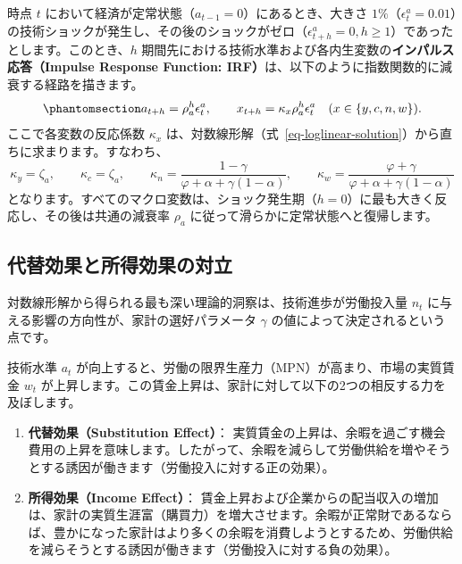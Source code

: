 \documentclass[
  japanese,
  lualatex,
  ja=standard,
  12pt,
  a4paper]{ltjsarticle}
\providecommand{\tightlist}{%
  \setlength{\itemsep}{0pt}\setlength{\parskip}{0pt}}
\begin{document}
時点 \(t\) において経済が定常状態（\(a_{t-1}=0\)）にあるとき、大きさ
\(1\%\)（\(\epsilon_t^a = 0.01\)）の技術ショックが発生し、その後のショックがゼロ（\(\epsilon_{t+h}^a = 0, h \geq 1\)）であったとします。このとき、\(h\)
期間先における技術水準および各内生変数の\textbf{インパルス応答（Impulse
Response Function:
IRF）}は、以下のように指数関数的に減衰する経路を描きます。
\begin{equation}\protect\phantomsection\label{eq-technology-irf}{
a_{t+h} = \rho_a^h \epsilon_t^a, \qquad x_{t+h} = \kappa_x \rho_a^h \epsilon_t^a \quad (x \in \{y, c, n, w\}).
}\end{equation} ここで各変数の反応係数 \(\kappa_x\)
は、対数線形解（式~\ref{eq-loglinear-solution}）から直ちに求まります。すなわち、
\[
\kappa_y = \zeta_a, \qquad \kappa_c = \zeta_a, \qquad \kappa_n = \frac{1-\gamma}{\varphi+\alpha+\gamma(1-\alpha)}, \qquad \kappa_w = \frac{\varphi+\gamma}{\varphi+\alpha+\gamma(1-\alpha)}
\]
となります。すべてのマクロ変数は、ショック発生期（\(h=0\)）に最も大きく反応し、その後は共通の減衰率
\(\rho_a\) に従って滑らかに定常状態へと復帰します。

\subsection{代替効果と所得効果の対立}\label{ux4ee3ux66ffux52b9ux679cux3068ux6240ux5f97ux52b9ux679cux306eux5bfeux7acb}

対数線形解から得られる最も深い理論的洞察は、技術進歩が労働投入量 \(n_t\)
に与える影響の方向性が、家計の選好パラメータ \(\gamma\)
の値によって決定されるという点です。

技術水準 \(a_t\)
が向上すると、労働の限界生産力（MPN）が高まり、市場の実質賃金 \(w_t\)
が上昇します。この賃金上昇は、家計に対して以下の2つの相反する力を及ぼします。

\begin{enumerate}
\def\labelenumi{\arabic{enumi}.}
\tightlist
\item
  \textbf{代替効果（Substitution Effect）}：
  実質賃金の上昇は、余暇を過ごす機会費用の上昇を意味します。したがって、余暇を減らして労働供給を増やそうとする誘因が働きます（労働投入に対する正の効果）。
\item
  \textbf{所得効果（Income Effect）}：
  賃金上昇および企業からの配当収入の増加は、家計の実質生涯富（購買力）を増大させます。余暇が正常財であるならば、豊かになった家計はより多くの余暇を消費しようとするため、労働供給を減らそうとする誘因が働きます（労働投入に対する負の効果）。
\end{enumerate}
\end{document}
